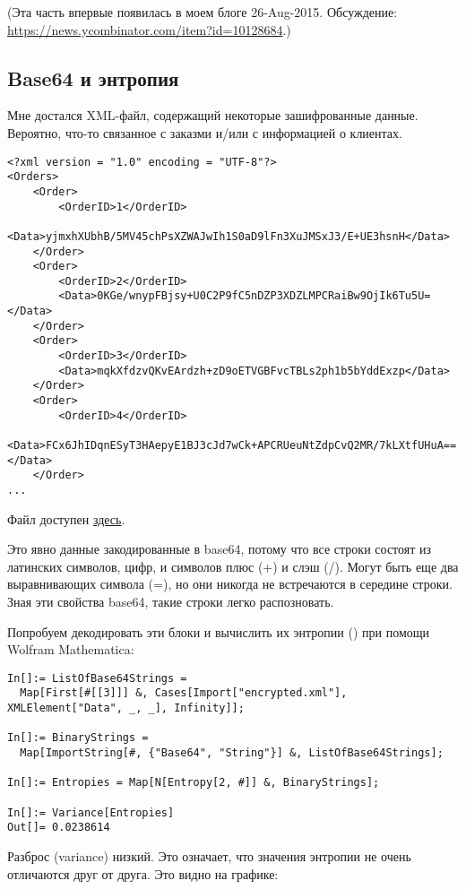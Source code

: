 \label{encrypted_DB1}

(Эта часть впервые появилась в моем блоге 26-Aug-2015.
Обсуждение: \url{https://news.ycombinator.com/item?id=10128684}.)

\subsection{Base64 и энтропия}

Мне достался \ac{XML}-файл, содержащий некоторые зашифрованные данные.
Вероятно, что-то связанное с заказми и/или с информацией о клиентах.

\begin{lstlisting}
<?xml version = "1.0" encoding = "UTF-8"?>
<Orders>
	<Order>
		<OrderID>1</OrderID>
		<Data>yjmxhXUbhB/5MV45chPsXZWAJwIh1S0aD9lFn3XuJMSxJ3/E+UE3hsnH</Data>
	</Order>
	<Order>
		<OrderID>2</OrderID>
		<Data>0KGe/wnypFBjsy+U0C2P9fC5nDZP3XDZLMPCRaiBw9OjIk6Tu5U=</Data>
	</Order>
	<Order>
		<OrderID>3</OrderID>
		<Data>mqkXfdzvQKvEArdzh+zD9oETVGBFvcTBLs2ph1b5bYddExzp</Data>
	</Order>
	<Order>
		<OrderID>4</OrderID>
		<Data>FCx6JhIDqnESyT3HAepyE1BJ3cJd7wCk+APCRUeuNtZdpCvQ2MR/7kLXtfUHuA==</Data>
	</Order>
...
\end{lstlisting}

Файл доступен \href{\RepoURL/examples/encrypted_DB1/encrypted.xml}{здесь}.

Это явно данные закодированные в base64, потому что все строки состоят из латинских символов, цифр,
и символов плюс (+) и слэш (/).
Могут быть еще два выравнивающих символа (=), но они никогда не встречаются в середине строки.
Зная эти свойства base64, такие строки легко распозновать.

Попробуем декодировать эти блоки и вычислить их энтропии () при помощи Wolfram Mathematica:

\begin{lstlisting}
In[]:= ListOfBase64Strings =
  Map[First[#[[3]]] &, Cases[Import["encrypted.xml"], XMLElement["Data", _, _], Infinity]];

In[]:= BinaryStrings =
  Map[ImportString[#, {"Base64", "String"}] &, ListOfBase64Strings];

In[]:= Entropies = Map[N[Entropy[2, #]] &, BinaryStrings];

In[]:= Variance[Entropies]
Out[]= 0.0238614
\end{lstlisting}

Разброс (variance) низкий.
Это означает, что значения энтропии не очень отличаются друг от друга.
Это видно на графике:

